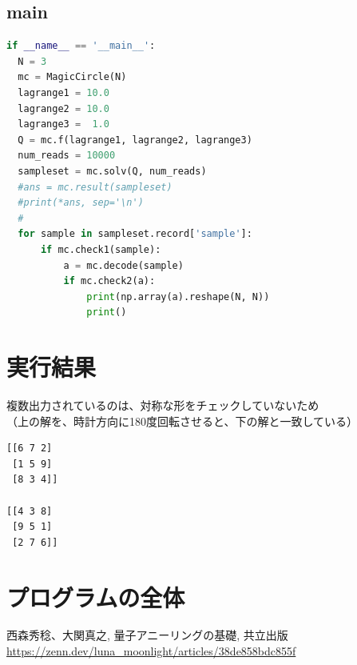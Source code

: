 \documentclass[uplatex,dvipdfmx,a4paper,11pt,oneside,openany]{jsbook}
\begin{document}
\subsection{main}

\begin{lstlisting}[language=Python]
if __name__ == '__main__':
  N = 3
  mc = MagicCircle(N)
  lagrange1 = 10.0
  lagrange2 = 10.0
  lagrange3 =  1.0
  Q = mc.f(lagrange1, lagrange2, lagrange3)
  num_reads = 10000
  sampleset = mc.solv(Q, num_reads)
  #ans = mc.result(sampleset)
  #print(*ans, sep='\n')
  #
  for sample in sampleset.record['sample']:
      if mc.check1(sample):
          a = mc.decode(sample)
          if mc.check2(a):
              print(np.array(a).reshape(N, N))
              print()
\end{lstlisting}


\section{実行結果}

複数出力されているのは、対称な形をチェックしていないため\\（上の解を、時計方向に180度回転させると、下の解と一致している）

\begin{verbatim}
[[6 7 2]
 [1 5 9]
 [8 3 4]]

[[4 3 8]
 [9 5 1]
 [2 7 6]]
\end{verbatim}

\section{プログラムの全体}



\begin{thebibliography}{9}
   西森秀稔、大関真之, 量子アニーリングの基礎, 共立出版
   \url{https://zenn.dev/luna_moonlight/articles/38de858bdc855f}
\end{thebibliography}
\end{document}

